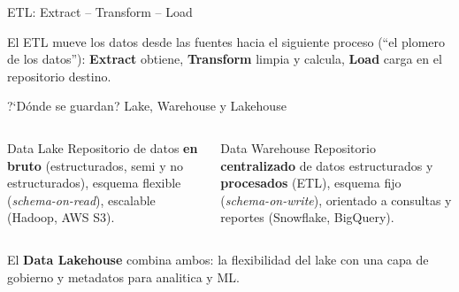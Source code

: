 \documentclass[aspectratio=169]{beamer}
\begin{document}
\begin{frame}[fragile]{ETL: Extract -- Transform -- Load}
  \begin{center}
  \end{center}
  \vspace{0.2em}
  El ETL mueve los datos desde las fuentes hacia el siguiente proceso (``el
  plomero de los datos''): \textbf{Extract} obtiene, \textbf{Transform} limpia y
  calcula, \textbf{Load} carga en el repositorio destino.
\end{frame}

\begin{frame}{?`D\'onde se guardan? Lake, Warehouse y Lakehouse}
  \begin{columns}[t]
      \begin{block}{Data Lake}
        Repositorio de datos \textbf{en bruto} (estructurados, semi y no
        estructurados), esquema flexible (\emph{schema-on-read}), escalable
        (Hadoop, AWS S3).
      \end{block}
      \begin{block}{Data Warehouse}
        Repositorio \textbf{centralizado} de datos estructurados y
        \textbf{procesados} (ETL), esquema fijo (\emph{schema-on-write}),
        orientado a consultas y reportes (Snowflake, BigQuery).
      \end{block}
  \end{columns}
  \vspace{0.3em}
  El \textbf{Data Lakehouse} combina ambos: la flexibilidad del lake con una capa
  de gobierno y metadatos para analitica y ML.
\end{frame}
\end{document}
